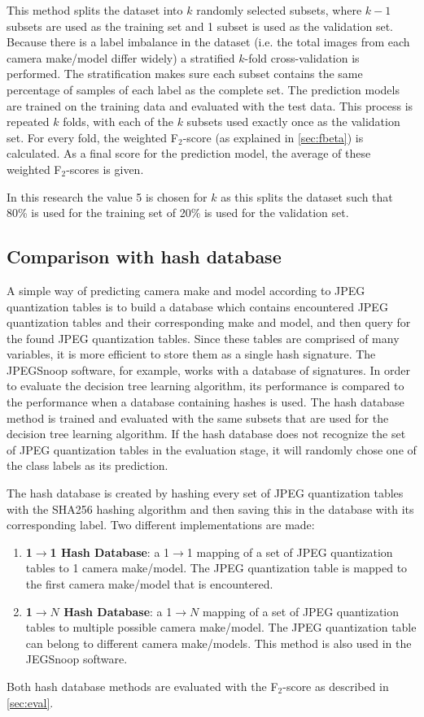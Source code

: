 This method splits the dataset into $k$ randomly selected subsets, where $k-1$ subsets are used as the training set and 1 subset is used as the validation set. Because there is a label imbalance in the dataset (i.e. the total images from each camera make/model differ widely) a stratified   $k$-fold cross-validation is performed. The stratification makes sure each subset contains the same percentage of samples of each label as the complete set. The prediction models are trained on the training data and evaluated with the test data. This process is repeated $k$ folds, with each of the $k$ subsets used exactly once as the validation set. For every fold, the weighted F$_2$-score (as explained in \autoref{sec:fbeta}) is calculated. As a final score for the prediction model, the average of these weighted F$_2$-scores is given.

In this research the value 5 is chosen for $k$ as this splits the dataset such that 80\% is used for the training set of 20\% is used for the validation set.

\subsection{Comparison with hash database}\label{sec:impl_hash}
A simple way of predicting camera make and model according to JPEG quantization tables is to build a database which contains encountered JPEG quantization tables and their corresponding make and model, and then query for the found JPEG quantization tables. Since these tables are comprised of many variables, it is more efficient to store them as a single hash signature. The JPEGSnoop software, for example, works with a database of signatures. In order to evaluate the decision tree learning algorithm, its performance is compared to the performance when a database containing hashes is used. The hash database method is trained and evaluated with the same subsets that are used for the decision tree learning algorithm. If the hash database does not recognize the set of JPEG quantization tables in the evaluation stage, it will randomly chose one of the class labels as its prediction. 

The hash database is created by hashing every set of JPEG quantization tables with the SHA256 hashing algorithm and then saving this in the database with its corresponding label. Two different implementations are made:
\begin{enumerate}
\item \textbf{1$\rightarrow$1 Hash Database}: a 1$\rightarrow$1 mapping of a set of JPEG quantization tables to 1 camera make/model. The JPEG quantization table is mapped to the first camera make/model that is encountered.
\item \textbf{1$\rightarrow N$ Hash Database}: a 1$\rightarrow N$ mapping of a set of JPEG quantization tables to multiple possible camera make/model. The JPEG quantization table can belong to different camera make/models. This method is also used in the JEGSnoop software. 
\end{enumerate}

Both hash database methods are evaluated with the F$_2$-score as described in \autoref{sec:eval}.